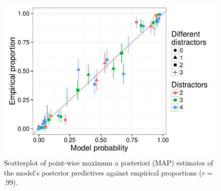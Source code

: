 \documentclass[11pt]{article}
\begin{document}
\begin{figure}
\centering
\includegraphics[width=.8\textwidth]{../../../models/1a_bda_basic/results_bda/graphs/predictives-collapsed-fixed-reducedconditions-unlogged}
\caption{Scatterplot of point-wise maximum a posteriori (MAP) estimates of the model's posterior predictives against empirical proportions ($r=$.99).}
\label{fig:modelexp1scatter}
\end{figure}
\end{document}

